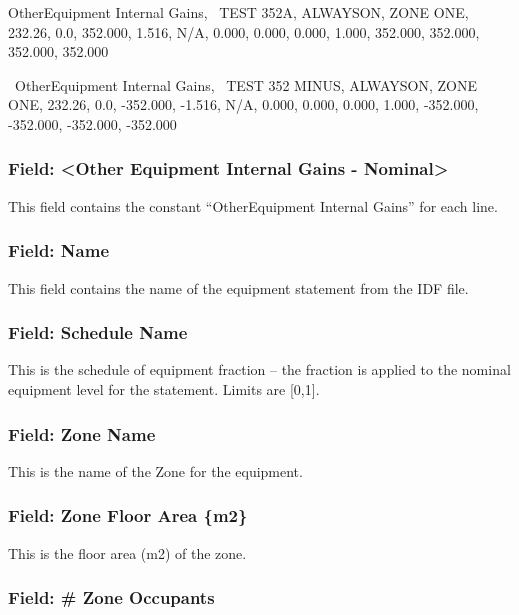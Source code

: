 OtherEquipment Internal Gains,~ TEST 352A, ALWAYSON, ZONE ONE, 232.26, 0.0, 352.000, 1.516, N/A, 0.000, 0.000, 0.000, 1.000, 352.000, 352.000, 352.000, 352.000

~OtherEquipment Internal Gains,~ TEST 352 MINUS, ALWAYSON, ZONE ONE, 232.26, 0.0, -352.000, -1.516, N/A, 0.000, 0.000, 0.000, 1.000, -352.000, -352.000, -352.000, -352.000

\subsubsection{Field: \textless{}Other Equipment Internal Gains - Nominal\textgreater{}}\label{field-other-equipment-internal-gains---nominal}

This field contains the constant ``OtherEquipment Internal Gains'' for each line.

\subsubsection{Field: Name}\label{field-name-4}

This field contains the name of the equipment statement from the IDF file.

\subsubsection{Field: Schedule Name}\label{field-schedule-name-3}

This is the schedule of equipment fraction -- the fraction is applied to the nominal equipment level for the statement. Limits are {[}0,1{]}.

\subsubsection{Field: Zone Name}\label{field-zone-name-5}

This is the name of the Zone for the equipment.

\subsubsection{Field: Zone Floor Area \{m2\}}\label{field-zone-floor-area-m2-3}

This is the floor area (m2) of the zone.

\subsubsection{Field: \# Zone Occupants}\label{field-zone-occupants-3}

